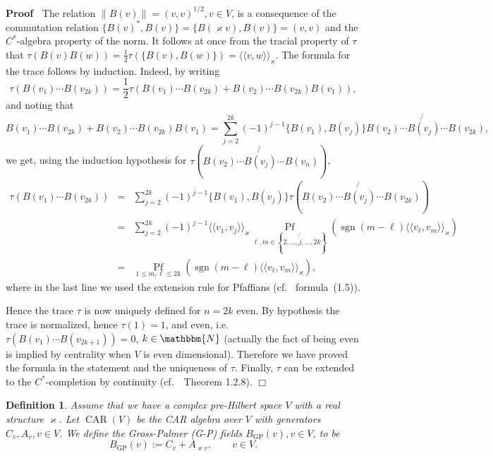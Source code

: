 \documentclass[11pt]{article}
\newcommand{\assign}{:=}
\newcommand{\llangle}{{\langle\!\langle}}
\newcommand{\rrangle}{{\rangle\!\rangle}}
\newcommand{\tmop}[1]{\ensuremath{\operatorname{#1}}}
\newenvironment{proof}{\noindent\textbf{Proof\ }}{\hspace*{\fill}$\Box$\medskip}
\newtheorem{definition}{Definition}
\begin{document}
\begin{proof}
  The relation $\| B (v) \| = (v, v)^{1 / 2}, v \in V$, is a consequence of
  the commutation relation $\{ B (v)^{\ast}, B (v) \} = \{ B (\varkappa v), B
  (v) \} = (v, v)$ and the $C^{\ast}$-algebra property of the norm. It follows
  at once from the tracial property of $\tau$ that $\tau (B (v) B (w)) =
  \tfrac{1}{2} \tau (\{ B (v), B (w_{}) \}) = \llangle v, w
  \rrangle_{\varkappa}$. The formula for the trace follows by induction.
  Indeed, by writing
  \[ \tau (B (v_1) \cdots B (v_{2 k})) = \frac{1}{2} \tau (B (v_1) \cdots B
     (v_{2 k}) + B (v_2) \cdots B (v_{2 k}) B (v_1)), \]
  and noting that
  \[ B (v_1) \cdots B (v_{2 k}) + B (v_2) \cdots B (v_{2 k}) B (v_1) = \sum_{j
     = 2}^{2 k} (- 1)^{j - 1} \{ B (v_1), B (v_j) \} B (v_2) \cdots \not{B
     (v_j)} \cdots B (v_{2 k}), \]
  we get, using the induction hypothesis for $\tau \left( B (v_2) \cdots
  \not{B (v_j)} \cdots B (v_n) \right)$,
  \begin{eqnarray*}
    \tau (B (v_1) \cdots B (v_{2 k})) & = & \sum^{2 k}_{j = 2} (- 1)^{j - 1}
    \{ B (v_1), B (v_j) \} \tau \left( B (v_2) \cdots \not{B (v_j)} \cdots B
    (v_{2 k}) \right)\\
    & = & \sum_{j = 2}^{2 k} (- 1)^{j - 1} \llangle v_1, v_j
    \rrangle_{\varkappa}  \underset{\ell, m \in \left\{ 2, \ldots, \not{j},
    \ldots, 2 k \right\}}{\tmop{Pf}} (\tmop{sgn} (m - \ell) \llangle v_{\ell},
    v_m \rrangle_{\varkappa})\\
    & = & \underset{1 \leqslant m, \ell \leqslant 2 k}{\tmop{Pf}} (\tmop{sgn}
    (m - \ell) \llangle v_{\ell}, v_m \rrangle_{\varkappa}),
  \end{eqnarray*}
  where in the last line we used the extension rule for Pfaffians
  (cf.~{\cite{caianiello_combinatorics_1973}} formula~(1.5)).
  
  Hence the trace $\tau$ is now uniquely defined for $n = 2 k$ even. By
  hypothesis the trace is normalized, hence $\tau (1) = 1$, and even, i.e.
  $\tau (B (v_1) \cdots B (v_{2 k + 1})) = 0$, $k \in \mathbbm{N}$ (actually
  the fact of being even is implied by centrality when $V$ is even
  dimensional). Therefore we have proved the formula in the statement and the
  uniqueness of $\tau$. Finally, $\tau$ can be extended to the
  $C^{\ast}$-completion by continuity
  (cf.~{\cite{plymen_spinors_1994}}~Theorem 1.2.8).
\end{proof}

\begin{definition}
  \label{def:clifford-car}Assume that we have a complex pre-Hilbert space $V$
  with a real structure $\varkappa$. Let $\tmop{CAR} (V)$ be the CAR algebra
  over $V$ with generators $C_v, A_v, v \in V$. We define the Gross-Palmer
  (G-P) fields $B_{\tmop{GP}} (v), v \in V$, to be
  \[ B_{\tmop{GP}} (v) \assign C_v + A_{\varkappa v}, \qquad v \in V. \]
\end{definition}
\end{document}
